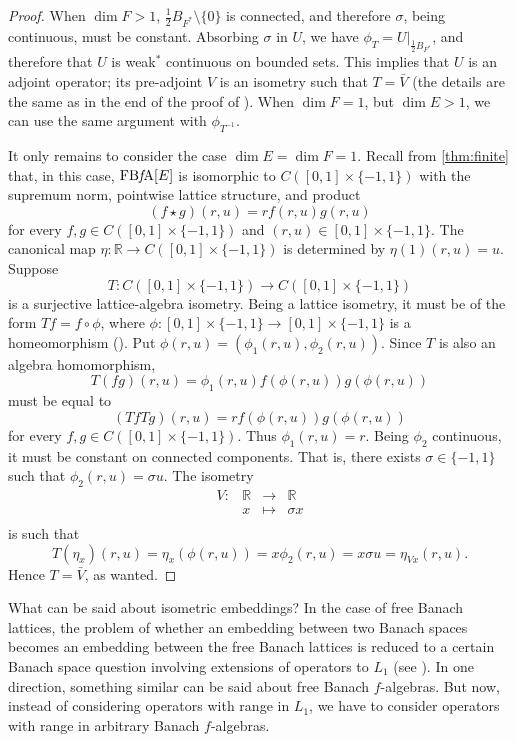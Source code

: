 \documentclass{memo-l}
\theoremstyle{definition}
\theoremstyle{remark}
\numberwithin{section}{chapter}
\numberwithin{equation}{chapter}
\newcommand\R{\ensuremath{\mathbb{R}}}
\newcommand{\falg}{$f\!$-algebra}
\newcommand{\FBFA}[1]{\operatorname{FB{\it f}\!A}[#1]}
\begin{document}
\begin{proof}
    When $\dim F>1$, $\frac{1}{2}B_{F^{*}}\setminus \{0\}$ is connected, and
    therefore $\sigma $, being continuous, must be constant. Absorbing
    $\sigma $ in $U$, we have $\phi
    _T=U|_{\frac{1}{2}B_{F^{*}}}$, and therefore
    that $U$ is weak$^*$ continuous on bounded sets. This implies that
    $U$ is an adjoint operator; its pre-adjoint $V$ is an isometry
    such that $T=\bar{V}$ (the details are the same as in the end of the
    proof of \cite[Theorem 10.18]{oikhberg_etal2022}). When $\dim
    F=1$, but $\dim E>1$, we can use the same argument with $\phi
    _{T^{-1}}$.

    It only remains to consider the case $\dim E=\dim F=1$. Recall
    from \cref{thm:finite} that, in this case, $\FBFA E$ is isomorphic
    to
    $C([0,1]\times \{-1,1\})$ with the supremum norm, pointwise
    lattice structure, and product
    \[
        (f \star g)(r,u )=rf(r,u )g(r,u
        )
    \]
    for every $f,g \in C([0,1]\times \{-1,1\})$ and $(r,u
    )\in [0,1]\times \{-1,1\}$. The canonical map $\eta \colon \R\to
    C([0,1]\times \{-1,1\})$ is determined by $\eta (1)(r,u
    )=u $. Suppose
    \[
    T\colon C([0,1]\times \{-1,1\})\to C([0,1]\times \{-1,1\})
    \]
    is a surjective lattice-algebra isometry. Being a lattice
    isometry, it must be of the form $Tf=f\circ \phi $, where $\phi
    \colon [0,1]\times \{-1,1\}\to [0,1]\times \{-1,1\}$ is a
    homeomorphism (\cite[Theorem 4.25]{abramovich_aliprantis2002}).
    Put $\phi (r,u )=(\phi _1(r,u ),\phi
    _2(r,u ))$.
    Since $T$ is also an algebra homomorphism,
    \[
    T(fg)(r,u )=\phi _1(r,u )f(\phi (r,u
    ))g(\phi (r,u ))
    \]
    must be equal to
    \[
        (TfTg)(r,u )=r f(\phi (r,u ))g(\phi
        (r,u ))
    \]
    for every $f,g \in C([0,1]\times \{-1,1\})$. Thus $\phi
    _1(r,u )=r$. Being $\phi _2$ continuous, it
    must be constant on connected components. That is, there exists
    $\sigma \in \{-1,1\}$ such that $\phi _2(r,u )=\sigma
    u $. The isometry
    \[
    \begin{array}{cccc}
    V\colon& \R & \longrightarrow & \R \\
            & x & \longmapsto & \sigma x \\
    \end{array}
    \]
    is such that
    \[
        T(\eta _x)(r,u )=\eta _x(\phi
        (r,u ))=x \phi _2(r,u )=x \sigma u
        =\eta _{Vx}(r,u ).
    \]
    Hence $T=\bar{V}$, as wanted.
\end{proof}

What can be said about isometric embeddings? In the case of free
Banach lattices, the problem of whether an embedding between two
Banach spaces becomes an embedding between the free Banach lattices is
reduced to a certain Banach space question involving extensions of
operators to $L_1$ (see \cite[Theorem 3.7]{oikhberg_etal2022}). In one
direction, something similar can be said about free Banach \falg s.
But now, instead of considering operators with range in $L_1$, we have
to consider operators with range in arbitrary Banach \falg s.
\end{document}
